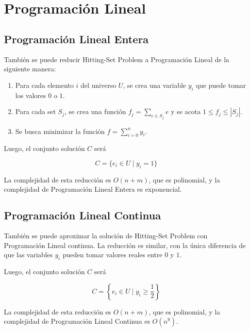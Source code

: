 \section{Programación Lineal}

\subsection{Programación Lineal Entera}

También se puede reducir Hitting-Set Problem a Programación Lineal de la siguiente manera:

\begin{enumerate}

    \item Para cada elemento $i$ del universo $U$, se crea una variable $y_{i}$ que puede tomar los valores $0$ o $1$.

    \item Para cada set $S_{j}$, se crea una función $f_{j}=\sum_{e \in S_j} e$ y se acota $1 \leq f_{j} \leq |S_{j}|$.

    \item Se busca minimizar la función $f=\sum_{i=0}^{n}y_{i}$.

\end{enumerate}

Luego, el conjunto solución $C$ será

\[
    C = \{e_i \in U \mid y_{i} = 1\}
\]

La complejidad de esta reducción es $O(n+m)$, que es polinomial, y la complejidad de Programación Lineal Entera es exponencial.

\subsection{Programación Lineal Continua}

También se puede aproximar la solución de Hitting-Set Problem con Programación Lineal continua. La reducción es similar, con la única diferencia de que las variables $y_{i}$ pueden tomar valores reales entre $0$ y $1$.

Luego, el conjunto solución $C$ será

\[
    C = \left\{e_i \in U \mid y_{i} \geq \frac{1}{2}\right\}
\]

La complejidad de esta reducción es $O(n+m)$, que es polinomial, y la complejidad de Programación Lineal Continua es $O(n^9)$.